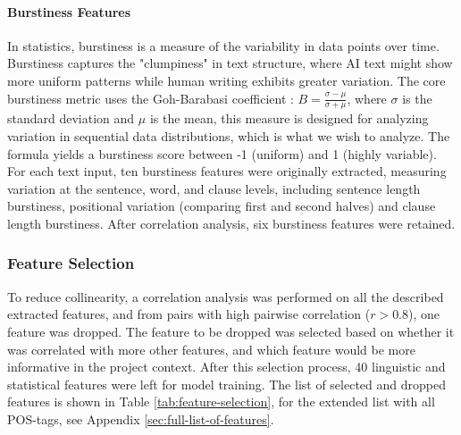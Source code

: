 \documentclass[11pt]{article}
\begin{document}
\paragraph{Burstiness Features}
In statistics, burstiness is a measure of the variability in data points over time. Burstiness captures the "clumpiness" in text structure, where AI text might show more uniform patterns while human writing exhibits greater variation. The core burstiness metric uses the Goh-Barabasi coefficient \citep{Goh_2008}: \(B = \frac{\sigma - \mu}{\sigma + \mu}\), where \(\sigma\) is the standard deviation and \(\mu\) is the mean, this measure is designed for analyzing variation in sequential data distributions, which is what we wish to analyze. The formula yields a burstiness score between -1 (uniform) and 1 (highly variable). For each text input, ten burstiness features were originally extracted, measuring variation at the sentence, word, and clause levels, including sentence length burstiness, positional variation (comparing first and second halves) and clause length burstiness. After correlation analysis, six burstiness features were retained.


\subsubsection{Feature Selection}
\label{sec:feature-selection}
To reduce collinearity, a correlation analysis was performed on all the described extracted features, and from pairs with high pairwise correlation ($r > 0.8$), one feature was dropped. The feature to be dropped was selected based on whether it was correlated with more other features, and which feature would be more informative in the project context. After this selection process, 40 linguistic and statistical features were left for model training. The list of selected and dropped features is shown in Table \ref{tab:feature-selection}, for the extended list with all POS-tags, see Appendix \ref{sec:full-list-of-features}.
\end{document}
